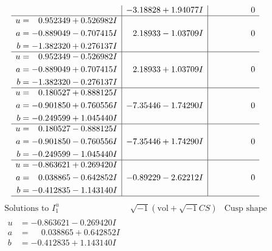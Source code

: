 \documentclass[1p]{elsarticle_modified}
\theoremstyle{definition}
\newcommand{\I}{\sqrt{-1}}
\begin{document}
$$\begin{array}{c|c|c}
 & -3.18828 + 1.94077 I & \phantom{-0.000000 } 0 \\ \hline\begin{aligned}
u &= \phantom{-}0.952349 + 0.526982 I \\
a &= -0.889049 - 0.707415 I \\
b &= -1.382320 + 0.276137 I\end{aligned}
 & \phantom{-}2.18933 - 1.03709 I & \phantom{-0.000000 } 0 \\ \hline\begin{aligned}
u &= \phantom{-}0.952349 - 0.526982 I \\
a &= -0.889049 + 0.707415 I \\
b &= -1.382320 - 0.276137 I\end{aligned}
 & \phantom{-}2.18933 + 1.03709 I & \phantom{-0.000000 } 0 \\ \hline\begin{aligned}
u &= \phantom{-}0.180527 + 0.888125 I \\
a &= -0.901850 + 0.760556 I \\
b &= -0.249599 + 1.045440 I\end{aligned}
 & -7.35446 - 1.74290 I & \phantom{-0.000000 } 0 \\ \hline\begin{aligned}
u &= \phantom{-}0.180527 - 0.888125 I \\
a &= -0.901850 - 0.760556 I \\
b &= -0.249599 - 1.045440 I\end{aligned}
 & -7.35446 + 1.74290 I & \phantom{-0.000000 } 0 \\ \hline\begin{aligned}
u &= -0.863621 + 0.269420 I \\
a &= \phantom{-}0.038865 - 0.642852 I \\
b &= -0.412835 - 1.143140 I\end{aligned}
 & -0.89229 - 2.62212 I & \phantom{-0.000000 } 0\\
 \hline 
 \end{array}$$\newpage$$\begin{array}{c|c|c}  
\text{Solutions to }I^u_{1}& \I (\text{vol} + \sqrt{-1}CS) & \text{Cusp shape}\\
 \hline 
\begin{aligned}
u &= -0.863621 - 0.269420 I \\
a &= \phantom{-}0.038865 + 0.642852 I \\
b &= -0.412835 + 1.143140 I\end{aligned}

\end{array}$$
\end{document}
